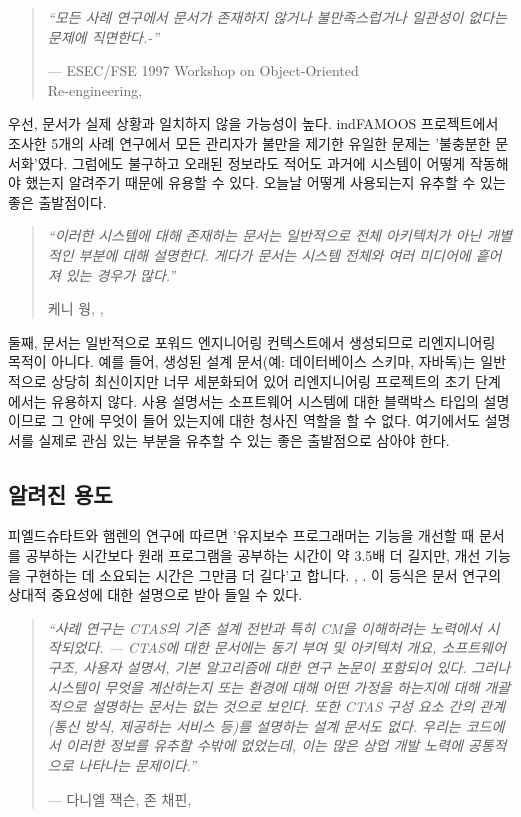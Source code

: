 \documentclass[a4paper,10pt,twoside]{book}
\begin{document}
\begin{quotation}
\noindent
\emph{``모든 사례 연구에서 문서가 존재하지 않거나 불만족스럽거나 일관성이 없다는 문제에 직면한다.-''}

\noindent
--- ESEC/FSE 1997 Workshop on Object-Oriented \\
Re-engineering, \cite{Deme97a}
\end{quotation}

우선, 문서가 실제 상황과 일치하지 않을 가능성이 높다. ind{FAMOOS} 프로젝트에서 조사한 5개의 사례 연구에서 모든 관리자가 불만을 제기한 유일한 문제는 '불충분한 문서화'였다. 그럼에도 불구하고 오래된 정보라도 적어도 과거에 시스템이 어떻게 작동해야 했는지 알려주기 때문에 유용할 수 있다. 오늘날 어떻게 사용되는지 유추할 수 있는 좋은 출발점이다.

\begin{quotation}
\noindent
\emph{``이러한 시스템에 대해 존재하는 문서는 일반적으로 전체 아키텍처가 아닌 개별적인 부분에 대해 설명한다. 게다가 문서는 시스템 전체와 여러 미디어에 흩어져 있는 경우가 많다.''}

\hfill 케니 웡, \etal, \cite{Wong95a}
\end{quotation}

둘째, 문서는 일반적으로 포워드 엔지니어링 컨텍스트에서 생성되므로 리엔지니어링 목적이 아니다. 예를 들어, 생성된 설계 문서(예: 데이터베이스 스키마, 자바독)는 일반적으로 상당히 최신이지만 너무 세분화되어 있어 리엔지니어링 프로젝트의 초기 단계에서는 유용하지 않다. 사용 설명서는 소프트웨어 시스템에 대한 블랙박스 타입의 설명이므로 그 안에 무엇이 들어 있는지에 대한 청사진 역할을 할 수 없다. 여기에서도 설명서를 실제로 관심 있는 부분을 유추할 수 있는 좋은 출발점으로 삼아야 한다.

\subsection*{알려진 용도}

피엘드슈타트와 햄렌의 연구에 따르면 '유지보수 프로그래머는 기능을 개선할 때 문서를 공부하는 시간보다 원래 프로그램을 공부하는 시간이 약 3.5배 더 길지만, 개선 기능을 구현하는 데 소요되는 시간은 그만큼 더 길다'고 합니다. \cite{Corb89a}, \cite{Fjel79a}. 이 등식은 문서 연구의 상대적 중요성에 대한 설명으로 받아 들일 수 있다.

\begin{quotation}
\noindent
\emph{``사례 연구는 CTAS의 기존 설계 전반과 특히 CM을 이해하려는 노력에서 시작되었다. --- CTAS에 대한 문서에는 동기 부여 및 아키텍처 개요, 소프트웨어 구조, 사용자 설명서, 기본 알고리즘에 대한 연구 논문이 포함되어 있다. 그러나 시스템이 무엇을 계산하는지 또는 환경에 대해 어떤 가정을 하는지에 대해 개괄적으로 설명하는 문서는 없는 것으로 보인다. 또한 CTAS 구성 요소 간의 관계(통신 방식, 제공하는 서비스 등)를 설명하는 설계 문서도 없다. 우리는 코드에서 이러한 정보를 유추할 수밖에 없었는데, 이는 많은 상업 개발 노력에 공통적으로 나타나는 문제이다.''}

\hfill --- 다니엘 잭슨, 존 채핀, \cite{Jack00a}
\end{quotation}
\end{document}

